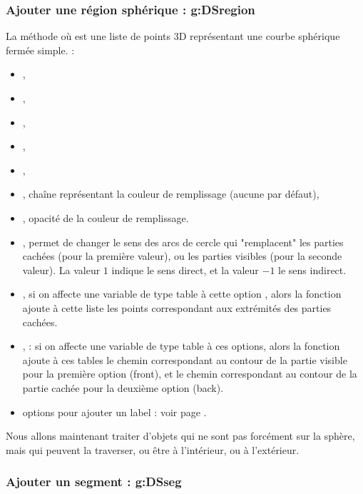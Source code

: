 \subsubsection{Ajouter une région sphérique : g:DSregion}

La méthode  où  est une liste de points 3D représentant une courbe sphérique fermée simple. \writeoptions :
    \begin{itemize}
        \item {}, 
        \item {},
        \item {},
        \item {},
        \item {},
        \item {}, chaîne représentant la couleur de remplissage (aucune par défaut),
        \item {}, opacité de la couleur de remplissage.
        \item  {}, permet de changer le sens des arcs de cercle qui "remplacent" les parties cachées (pour la première valeur), ou les parties visibles (pour la seconde valeur). La valeur $1$ indique le sens direct, et la valeur $-1$ le sens indirect.
        \item {}, si on affecte une variable de type table à cette option , alors la fonction ajoute à cette liste les points correspondant aux extrémités des parties cachées.
        \item {},  : si on affecte une variable de type table à ces options, alors la fonction ajoute à ces tables le chemin correspondant au contour de la partie visible pour la première option (front), et le  chemin correspondant au contour de la partie cachée pour la deuxième option (back).        
        \item options pour ajouter un label : voir page \pageref{addlabel}.
    \end{itemize}
    
Nous allons maintenant traiter d'objets qui ne sont pas forcément sur la sphère, mais qui peuvent la traverser, ou être à l'intérieur, ou à l'extérieur.

\subsubsection{ Ajouter un segment : g:DSseg}

